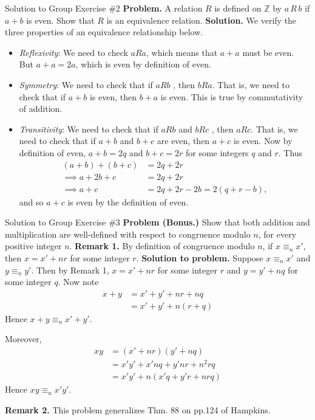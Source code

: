 \documentclass[10pt]{beamer}
\begin{document}
\begin{frame}{Solution to Group Exercise \#2} 
\small 
\textbf{Problem.} A relation $R$ is defined on $\mathbb{Z}$ by $a\,R\,b$ if $a+b$ is even.  Show that $R$ is an equivalence relation.
\vfill 
\textbf{Solution.} We verify the three properties of an equivalence relationship below.


\begin{itemize}
\item \textit{Reflexivity}:  We need to check $aRa$, which means that $a+a$ must be even. But $a+a=2a$, which is even by definition of even. \; \greencheck
\item \textit{Symmetry}: We need to check that if $aRb$ , then $bRa$.  That is, we need to check that if $a+b$ is even, then $b+a$ is even. This is true by commutativity of addition. \; \greencheck
\item \textit{Transitivity}:  We need to check that if $aRb$ and $bRc$ , then $aRc$.   That is, we need to check that if $a+b$ and $b+c$ are even, then $a+c$ is even.  Now by definition of even, $a+b=2q$ and $b+c=2r$ for some integers $q$ and $r$.  Thus
\begin{align*}
(a+b) + (b+c) &= 2q+2r \\
\implies a+2b+c &= 2q+2r \\
\implies a+c &= 2q+2r -2b = 2(q+r-b),	
\end{align*}
and so $a+c$ is even by the definition of even. \greencheck
\end{itemize}
\end{frame}

\begin{frame}{Solution to Group Exercise \#3} 
\small 
\textbf{Problem (Bonus.)} Show that both addition and multiplication are well-defined with respect to congruence modulo $n$, for every positive integer $n$.
\vfill 
\textbf{Remark 1.} By definition of congruence modulo $n$, if $x \equiv_n x'$, then $x=x' + nr$ for some integer $r$.
\vfill 
\textbf{Solution to problem.}  Suppose $x \equiv_n x'$ and $y \equiv_n y'$.  Then by Remark 1, $x=x' + nr$ for some integer $r$ and $y=y' + nq$ for some integer $q$. Now note
%
\begin{align*}
x+y &= x' + y' + nr+ nq \\
&= x' +y' + n(r+q)	
\end{align*}
Hence  $x+y \equiv_n x'+y'$. \greencheck 

Moreover,
\begin{align*}
xy &= (x' +nr) (y' + nq) \\
&= x'y' + x'nq + y'nr + n^2rq \\
&= x'y' + n(x'q + y'r + nrq)	
\end{align*}
Hence  $xy \equiv_n x'y'$. \greencheck 

\vfill 
\textbf{Remark 2.} This problem generalizes Thm. 88 on pp.124 of  Hampkins. 

\end{frame}
\end{document}
